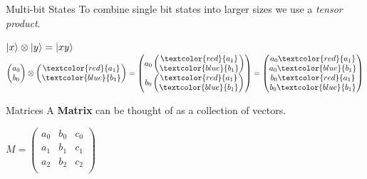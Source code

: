 \documentclass{beamer}
\begin{document}
\begin{frame}{Multi-bit States}
To combine single bit states into larger sizes we use a \emph{tensor product}.\vfill

\centering
\begin{math}
    \ket{x} \otimes \ket{y}
    = \ket{xy}
\end{math}\vfill
\begin{math}
    \begin{pmatrix}
        a_0 \\ b_0
    \end{pmatrix}
    \otimes
    \begin{pmatrix}
        \textcolor{red}{a_1} \\ \textcolor{blue}{b_1}
    \end{pmatrix}
    = 
    \begin{pmatrix}
        a_0
        \begin{pmatrix}
            \textcolor{red}{a_1} \\ \textcolor{blue}{b_1}
        \end{pmatrix}
    \\ b_0
        \begin{pmatrix}
            \textcolor{red}{a_1} \\ \textcolor{blue}{b_1}
        \end{pmatrix}
    \end{pmatrix}
    =
    \begin{pmatrix}
        a_0 \textcolor{red}{a_1} \\ a_0 \textcolor{blue}{b_1} \\ b_0 \textcolor{red}{a_1} \\ b_0 \textcolor{blue}{b_1}
    \end{pmatrix}
\end{math}
\end{frame}

\begin{frame}{Matrices}
    A \textbf{Matrix} can be thought of as a collection of vectors.
    \begin{center}
        \begin{math}
            M =
            \begin{pmatrix}
                a_0 & b_0 & c_0 \\
                a_1 & b_1 & c_1 \\
                a_2 & b_2 & c_2 \\
            \end{pmatrix}
        \end{math}
    \end{center}
\end{frame}
\end{document}
